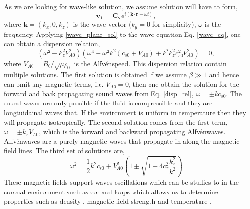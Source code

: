 \documentclass[12pt]{ociamthesis}
\newcommand{\bs}[1]{\boldsymbol{#1}}
\newcommand{\eref}[1]{Eq. \eqref{#1}}
\newcommand{\Alfven}{Alfv\'{e}n}
\begin{document}
As we are looking for wave-like solution, we assume solution will have to form,
\begin{equation}\label{wave_plane_sol}
    \bs{v_1} = \bs{C_v} e^{i( \bs{k}\cdot \bs{r} - \omega t)},
\end{equation}
where $\bs{k}=(k_x,0,k_z)$ is the wave vector ($k_y=0$ for simplicity), $\omega$ is the frequency. Applying \eqref{wave_plane_sol} to the wave equation \eref{wave_eq}, one can obtain a dispersion relation,
\begin{equation}\label{disp_rel}
 (\omega^2-k^2_z V_{A0}^2)(\omega^4-\omega^2k^2(c_{s0}+V_{A0})+k^2 k^2_z c_{s0}^2 V_{A0}^2) = 0,
\end{equation}
where $V_{A0}=B_0/\sqrt{\mu \rho_0}$ is the \Alfven speed. This dispersion relation contain multiple solutions. The first solution is obtained if we assume $\beta \gg 1$ and hence can omit any magnetic terms, i.e. $V_{A0}=0$, then one obtain the solution for the forward and back propagating sound waves from \eref{disp_rel}, $\omega = \pm k c_{s0}$. The sound waves are only possible if the fluid is compressible and they are longtuidainal waves that. If the environment is uniform in temperature then they will propagate isotropically. The second solution comes from the first term, $\omega=\pm k_z V_{A0}$, which is the forward and backward propagating \Alfven waves. \Alfven waves are a purely magnetic waves that propagate in along the magnetic field lines. The third set of solutions are,
\begin{equation}
    \omega^2 = \frac{1}{2} k^2{c_{s0}+V_{A0}^2} \left( 1 \pm \sqrt{1-4c^2_T \frac{ k^2_z}{k^2}}  \right)
\end{equation}
These magnetic fields support waves oscillations which can be studies to in the coronal environment such as coronal loops which allows us to determine properties such as density \citep{Verwichte_2013A_A}, magnetic field strength \citep{Nakariakov_2001} and temperature \citep{De_Moortel_2003SoPh}.
\end{document}
